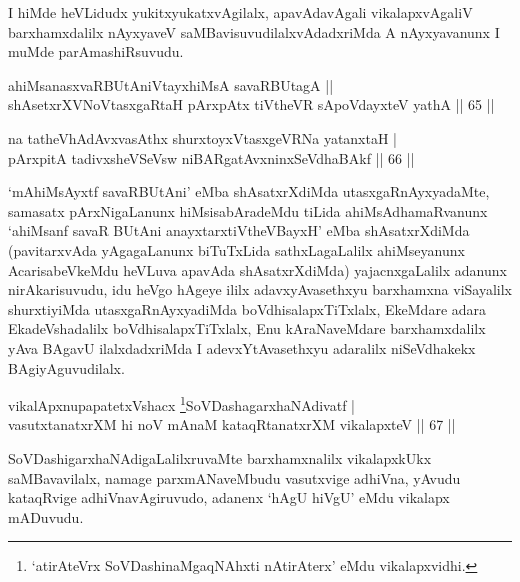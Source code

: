 \begin{artha}
I hiMde heVLidudx yukitxyukatxvAgilalx, apavAdavAgali vikalapxvAgaliV barxhamxdalilx nAyxyaveV saMBavisuvudilalxvAdadxriMda A nAyxyavanunx I muMde parAmashiRsuvudu.
\end{artha}


\begin{shl}
ahiMsanasxvaRBUtAniVtayxhiMsA savaRBUtagA ||  \\
shAsetxrXVNoVtasxgaRtaH pArxpAtx tiVtheVR sA\s poVdayxteV yathA \hfill||  65 ||  
\end{shl}

\begin{shl}
na tatheVhAdAvxvasAthx shurxtoyxVtasxgeVRNa yatanxtaH  | \\
pArxpitA tadivxsheVSeV\s sw niBARgatAvxninxSeVdhaBAkf \hfill ||  66 ||  
\end{shl}

\begin{artha}
`mAhiMsAyxtf savaRBUtAni' eMba shAsatxrXdiMda utasxgaRnAyxyadaMte, samasatx pArxNigaLanunx hiMsisabAradeMdu tiLida ahiMsAdhamaRvanunx `ahiMsanf savaR BUtAni anayxtarxtiVtheVBayxH' eMba shAsatxrXdiMda (pavitarxvAda yAgagaLanunx biTuTxLida sathxLagaLalilx ahiMseyanunx AcarisabeVkeMdu heVLuva apavAda shAsatxrXdiMda) yajacnxgaLalilx adanunx nirAkarisuvudu, idu heVgo hAgeye ililx adavxyAvasethxyu barxhamxna viSayalilx shurxtiyiMda utasxgaRnAyxyadiMda boVdhisalapxTiTxlalx, EkeMdare adara EkadeVshadalilx boVdhisalapxTiTxlalx, Enu kAraNaveMdare barxhamxdalilx yAva BAgavU ilalxdadxriMda I adevxYtAvasethxyu adaralilx niSeVdhakekx BAgiyAguvudilalx.
\end{artha}



\begin{shl}
vikalApxnupapatetxVshacx \footnote{`atirAteVrx SoVDashinaMgaqNAhxti nAtirAterx' eMdu vikalapxvidhi.}SoVDashagarxhaNAdivatf  | \\
vasutxtanatxrXM hi noV mAnaM kataqRtanatxrXM vikalapxteV \hfill ||  67 ||  
\end{shl}

\begin{artha}
SoVDashigarxhaNAdigaLalilxruvaMte barxhamxnalilx vikalapxkUkx saMBavavilalx, namage parxmANaveMbudu vasutxvige adhiVna, yAvudu kataqRvige adhiVnavAgiruvudo, adanenx `hAgU hiVgU' eMdu vikalapx mADuvudu.
\end{artha}

